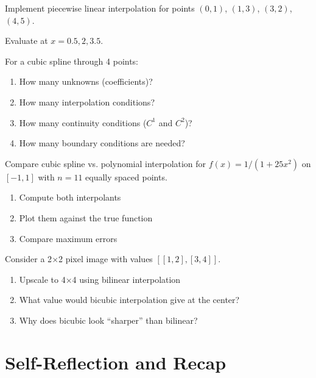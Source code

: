 
 Implement piecewise linear interpolation for points $(0, 1)$, $(1, 3)$, $(3, 2)$, $(4, 5)$.

Evaluate at $x = 0.5, 2, 3.5$.


\vspace{2em}
 For a cubic spline through 4 points:
\begin{enumerate}
    \item How many unknowns (coefficients)?
    \item How many interpolation conditions?
    \item How many continuity conditions ($C^1$ and $C^2$)?
    \item How many boundary conditions are needed?
\end{enumerate}


\vspace{2em}
 Compare cubic spline vs. polynomial interpolation for $f(x) = 1/(1 + 25x^2)$ on $[-1, 1]$ with $n = 11$ equally spaced points.

\begin{enumerate}
    \item Compute both interpolants
    \item Plot them against the true function
    \item Compare maximum errors
\end{enumerate}


\vspace{2em}
 Consider a 2$\times$2 pixel image with values $[[1, 2], [3, 4]]$.

\begin{enumerate}
    \item Upscale to 4$\times$4 using bilinear interpolation
    \item What value would bicubic interpolation give at the center?
    \item Why does bicubic look ``sharper'' than bilinear?
\end{enumerate}




\newpage
\section{Self-Reflection and Recap}

